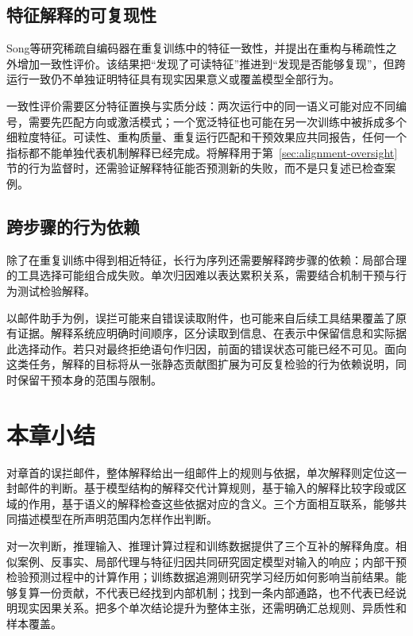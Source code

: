 \subsection{特征解释的可复现性}

Song等研究稀疏自编码器在重复训练中的特征一致性，并提出在重构与稀疏性之外增加一致性评价。该结果把“发现了可读特征”推进到“发现是否能够复现”，但跨运行一致仍不单独证明特征具有现实因果意义或覆盖模型全部行为。

一致性评价需要区分特征置换与实质分歧：两次运行中的同一语义可能对应不同编号，需要先匹配方向或激活模式；一个宽泛特征也可能在另一次训练中被拆成多个细粒度特征。可读性、重构质量、重复运行匹配和干预效果应共同报告，任何一个指标都不能单独代表机制解释已经完成。将解释用于第~\ref{sec:alignment-oversight}节的行为监督时，还需验证解释特征能否预测新的失败，而不是只复述已检查案例。

\subsection{跨步骤的行为依赖}

除了在重复训练中得到相近特征，长行为序列还需要解释跨步骤的依赖：局部合理的工具选择可能组合成失败。单次归因难以表达累积关系，需要结合机制干预与行为测试检验解释。

以邮件助手为例，误拦可能来自错误读取附件，也可能来自后续工具结果覆盖了原有证据。解释系统应明确时间顺序，区分读取到信息、在表示中保留信息和实际据此选择动作。若只对最终拒绝语句作归因，前面的错误状态可能已经不可见。面向这类任务，解释的目标将从一张静态贡献图扩展为可反复检验的行为依赖说明，同时保留干预本身的范围与限制。

\section{本章小结}
\label{sec:interpretability-summary}

对章首的误拦邮件，整体解释给出一组邮件上的规则与依据，单次解释则定位这一封邮件的判断。基于模型结构的解释交代计算规则，基于输入的解释比较字段或区域的作用，基于语义的解释检查这些依据对应的含义。三个方面相互联系，能够共同描述模型在所声明范围内怎样作出判断。

对一次判断，推理输入、推理计算过程和训练数据提供了三个互补的解释角度。相似案例、反事实、局部代理与特征归因共同研究固定模型对输入的响应；内部干预检验预测过程中的计算作用；训练数据追溯则研究学习经历如何影响当前结果。能够复算一份贡献，不代表已经找到内部机制；找到一条内部通路，也不代表已经说明现实因果关系。把多个单次结论提升为整体主张，还需明确汇总规则、异质性和样本覆盖。

